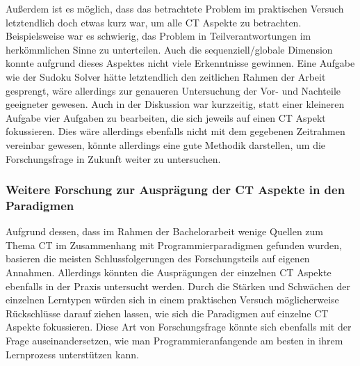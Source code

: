 Außerdem ist es möglich, dass das betrachtete Problem im praktischen Versuch letztendlich doch etwas kurz war, um alle CT Aspekte zu betrachten. Beispielsweise war es schwierig, das Problem in Teilverantwortungen im herkömmlichen Sinne zu unterteilen. Auch die sequenziell/globale Dimension konnte aufgrund dieses Aspektes nicht viele Erkenntnisse gewinnen.
Eine Aufgabe wie der Sudoku Solver hätte letztendlich den zeitlichen Rahmen der Arbeit gesprengt, wäre allerdings zur genaueren Untersuchung der Vor- und Nachteile geeigneter gewesen. Auch in der Diskussion war kurzzeitig, statt einer kleineren Aufgabe vier Aufgaben zu bearbeiten, die sich jeweils auf einen CT Aspekt fokussieren. Dies wäre allerdings ebenfalls nicht mit dem gegebenen Zeitrahmen vereinbar gewesen, könnte allerdings eine gute Methodik darstellen, um die Forschungsfrage in Zukunft weiter zu untersuchen.

\subsubsection{Weitere Forschung zur Ausprägung der CT Aspekte in den Paradigmen}
Aufgrund dessen, dass im Rahmen der Bachelorarbeit wenige Quellen zum Thema CT im Zusammenhang mit Programmierparadigmen gefunden wurden, basieren die meisten Schlussfolgerungen des Forschungsteils auf eigenen Annahmen. Allerdings könnten die Ausprägungen der einzelnen CT Aspekte ebenfalls in der Praxis untersucht werden.
Durch die Stärken und Schwächen der einzelnen Lerntypen würden sich in einem praktischen Versuch möglicherweise Rückschlüsse darauf ziehen lassen, wie sich die Paradigmen auf einzelne CT Aspekte fokussieren.
Diese Art von Forschungsfrage könnte sich ebenfalls mit der Frage auseinandersetzen, wie man Programmieranfangende am besten in ihrem Lernprozess unterstützen kann.
